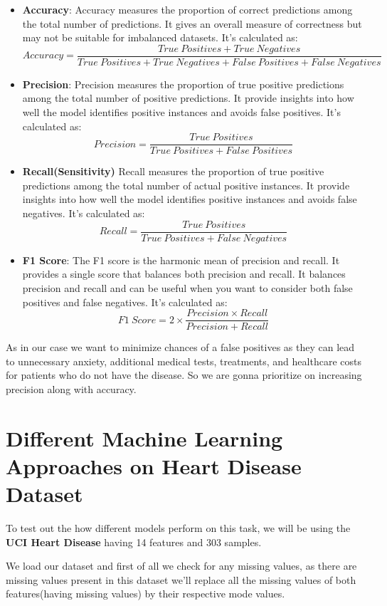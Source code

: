 \documentclass{article}
\begin{document}
\begin{itemize}
    \item \textbf{Accuracy}: Accuracy measures the proportion of correct predictions among the total number of predictions. It gives an overall measure of correctness but may not be suitable for imbalanced datasets. It's calculated as: 
$$Accuracy = \frac{True\ Positives + True\ Negatives}{True\ Positives + True\ Negatives + False\ Positives + False\ Negatives}$$
\item \textbf{Precision}: Precision measures the proportion of true positive predictions among the total number of positive predictions. It provide insights into how well the model identifies positive instances and avoids false positives. It's calculated as: 
$$Precision = \frac{True\ Positives}{True\ Positives + False\ Positives}$$
\item \textbf{Recall(Sensitivity)} Recall measures the proportion of true positive predictions among the total number of actual positive instances. It provide insights into how well the model identifies positive instances and avoids false negatives. It's calculated as:
$$Recall = \frac{True\ Positives}{True\ Positives + False\ Negatives}$$
\item \textbf{F1 Score}: The F1 score is the harmonic mean of precision and recall. It provides a single score that balances both precision and recall. It balances precision and recall and can be useful when you want to consider both false positives and false negatives. 
It's calculated as:
$$F1 \ Score = 2 \times \frac{Precision \times Recall}{Precision + Recall}$$
\end{itemize}
\noindent As in our case we want to minimize chances of a false positives as they can lead to unnecessary anxiety, additional medical tests, treatments, and healthcare costs for patients who do not have the disease. So we are gonna prioritize on increasing precision along with accuracy.

\section{Different Machine Learning Approaches on Heart Disease Dataset}
To test out the how different models perform on this task, we will be using the \textbf{UCI Heart Disease} having 14 features and 303 samples.

We load our dataset and first of all we check for any missing values, as there are missing values present in this dataset we'll replace all the missing values of both features(having missing values) by their respective mode values.
\end{document}

